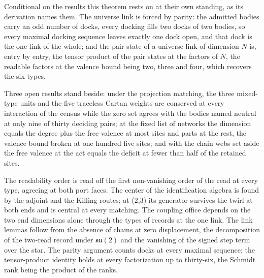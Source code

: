 \begin{chconditional}\label{box:I-2-link-and-its-six-genres:7}
Conditional on the results this theorem rests on at their own standing, as its derivation names them.
The universe link is forced by parity: the admitted bodies carry an odd number of docks, every docking fills two docks of two bodies, so every maximal docking sequence leaves exactly one dock open, and that dock is the one link of the whole; and the pair state of a universe link of dimension $N$ is, entry by entry, the tensor product of the pair states at the factors of $N$, the readable factors at the valence bound being two, three and four, which recovers the six types.
\end{chconditional}
\begin{chwall}\label{box:I-2-link-and-its-six-genres:8}
Three open results stand beside: under the projection matching, the three mixed-type units and the five traceless Cartan weights are conserved at every interaction of the census while the zero set agrees with the bodies named neutral at only nine of thirty deciding pairs; at the fixed list of networks the dimension equals the degree plus the free valence at most sites and parts at the rest, the valence bound broken at one hundred five sites; and with the chain webs set aside the free valence at the act equals the deficit at fewer than half of the retained sites.
\end{chwall}
The readability order is read off the first non-vanishing order of the read at every type, agreeing at both port faces. The center of the identification algebra is found by the adjoint and the Killing routes; at (2,3) its generator survives the twirl at both ends and is central at every matching. The coupling office depends on the two end dimensions alone through the types of records at the one link. The link lemmas follow from the absence of chains at zero displacement, the decomposition of the two-read record under $\mathfrak{su}(2)$ and the vanishing of the signed step term over the star. The parity argument counts docks at every maximal sequence; the tensor-product identity holds at every factorization up to thirty-six, the Schmidt rank being the product of the ranks.

